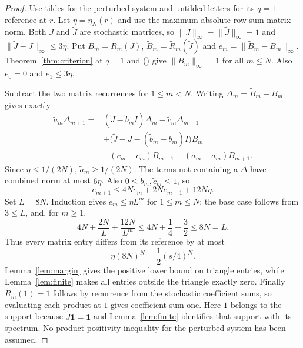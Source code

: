 \documentclass[twoside,10pt]{article}
\numberwithin{equation}{section}
\theoremstyle{slbody}
\theoremstyle{definition}
\theoremstyle{remark}
\renewcommand{\eqref}[1]{\textup{{\normalfont(\oldstylenums{\ref{#1}}}\normalfont)}}
\begin{document}
\begin{proof}
Use tildes for the perturbed system and untilded letters for its $q=1$ reference at $r$. Let $\eta=\eta_N(r)$ and use the maximum absolute row-sum matrix norm. Both $J$ and $\widetilde J$ are stochastic matrices, so $\|J\|_\infty=\|\widetilde J\|_\infty=1$ and $\|\widetilde J-J\|_\infty\leq3\eta$. Put $B_m=R_m(J)$, $\widetilde B_m=\widetilde R_m(\widetilde J)$ and $e_m=\|\widetilde B_m-B_m\|_\infty$. Theorem~\ref{thm:criterion} at $q=1$ and \eqref{eq:matrix-product} give $\|B_m\|_\infty=1$ for all $m\leq N$. Also $e_0=0$ and $e_1\leq3\eta$.

Subtract the two matrix recurrences for $1\leq m<N$. Writing $\Delta_m=\widetilde B_m-B_m$ gives exactly
\begin{align*}
\widetilde a_m\Delta_{m+1}
={}&(\widetilde J-\widetilde b_m I)\Delta_m-\widetilde c_m\Delta_{m-1}\\
 &+\big(\widetilde J-J-(\widetilde b_m-b_m)I\big)B_m\\
 &-(\widetilde c_m-c_m)B_{m-1}-(\widetilde a_m-a_m)B_{m+1}.
\end{align*}
Since $\eta\leq1/(2N)$, $\widetilde a_m\geq1/(2N)$. The terms not containing a $\Delta$ have combined norm at most $6\eta$. Also $0\leq\widetilde b_m,\widetilde c_m\leq1$, so
\begin{equation}\label{eq:error-recursion}
e_{m+1}\leq4Ne_m+2Ne_{m-1}+12N\eta.
\end{equation}
Set $L=8N$. Induction gives $e_m\leq\eta L^m$ for $1\leq m\leq N$: the base case follows from $3\leq L$, and, for $m\geq1$,
\[
4N+\frac{2N}{L}+\frac{12N}{L^m}
\leq4N+\frac14+\frac32\leq8N=L.
\]
Thus every matrix entry differs from its reference by at most
\[
\eta(8N)^N=\frac12(s/4)^N.
\]
Lemma~\ref{lem:margin} gives the positive lower bound on triangle entries, while Lemma~\ref{lem:finite} makes all entries outside the triangle exactly zero. Finally $\widetilde R_m(1)=1$ follows by recurrence from the stochastic coefficient sums, so evaluating each product at $1$ gives coefficient sum one. Here $1$ belongs to the support because $\widetilde J\boldsymbol1=\boldsymbol1$ and Lemma~\ref{lem:finite} identifies that support with its spectrum. No product-positivity inequality for the perturbed system has been assumed.
\end{proof}
\end{document}
